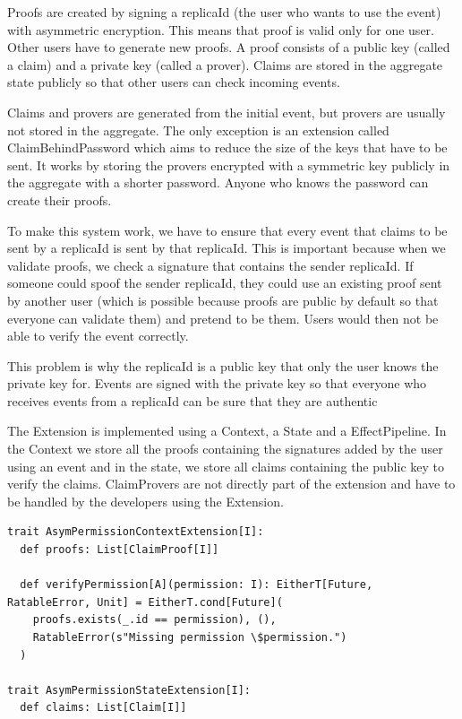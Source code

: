 \documentclass[
	ngerman,
	ruledheaders=section,   %
	class=report,		    %
	thesis={type=bachelor}, %
	accentcolor=9c,			%
	custommargins=true,    %
	marginpar=false,        %
	parskip=half-,          %
	fontsize=11pt,          %
]{tudapub}
\begin{document}
Proofs are created by signing a replicaId (the user who wants to use the event) with asymmetric encryption. This means that proof is valid only for one user. Other users have to generate new proofs. A proof consists of a public key (called a claim) and a private key (called a prover). Claims are stored in the aggregate state publicly so that other users can check incoming events.

Claims and provers are generated from the initial event, but provers are usually not stored in the aggregate. The only exception is an extension called ClaimBehindPassword which aims to reduce the size of the keys that have to be sent. It works by storing the provers encrypted with a symmetric key publicly in the aggregate with a shorter password. Anyone who knows the password can create their proofs.

To make this system work, we have to ensure that every event that claims to be sent by a replicaId is sent by that replicaId. This is important because when we validate proofs, we check a signature that contains the sender replicaId. If someone could spoof the sender replicaId, they could use an existing proof sent by another user (which is possible because proofs are public by default so that everyone can validate them) and pretend to be them. Users would then not be able to verify the event correctly.

This problem is why the replicaId is a public key that only the user knows the private key for. Events are signed with the private key so that everyone who receives events from a replicaId can be sure that they are authentic

The Extension is implemented using a Context, a State and a EffectPipeline. In the Context we store all the proofs containing the signatures added by the user using an event and in the state, we store all claims containing the public key to verify the claims. ClaimProvers are not directly part of the extension and have to be handled by the developers using the Extension.

\begin{lstlisting}
trait AsymPermissionContextExtension[I]:
  def proofs: List[ClaimProof[I]]

  def verifyPermission[A](permission: I): EitherT[Future, RatableError, Unit] = EitherT.cond[Future](
    proofs.exists(_.id == permission), (),
    RatableError(s"Missing permission \$permission.")
  )

trait AsymPermissionStateExtension[I]:
  def claims: List[Claim[I]]
\end{lstlisting}
\end{document}
